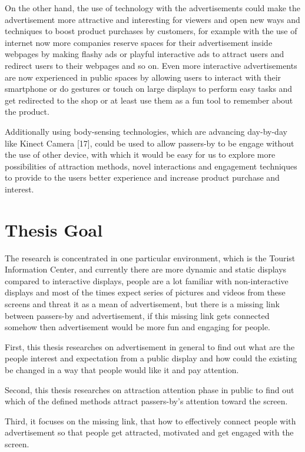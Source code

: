 On the other hand, the use of technology with the advertisements could make the advertisement more attractive and interesting for viewers and open new ways and techniques to boost product purchases by customers, for example with the use of internet now more companies reserve spaces for their advertisement inside webpages by making flashy ads or playful interactive ads to attract users and redirect users to their webpages and so on. Even more interactive advertisements are now experienced in public spaces by allowing users to interact with their smartphone or do gestures or touch on large displays to perform easy tasks and get redirected to the shop or at least use them as a fun tool to remember about the product.

Additionally using body-sensing technologies, which are advancing day-by-day like Kinect Camera [17], could be used to allow passers-by to be engage without the use of other device, with which it would be easy for us to explore more possibilities of attraction methods, novel interactions and engagement techniques to provide to the users better experience and increase product purchase and interest.


\section{Thesis Goal}
The research is concentrated in one particular environment, which is the Tourist Information Center, and currently there are more dynamic and static displays compared to interactive displays, people are a lot familiar with non-interactive displays and most of the times expect series of pictures and videos from these screens and threat it as a mean of advertisement, but there is a missing link between passers-by and advertisement, if this missing link gets connected somehow then advertisement would be more fun and engaging for people.

First, this thesis researches on advertisement in general to find out what are the people interest and expectation from a public display and how could the existing be changed in a way that people would like it and pay attention.

Second, this thesis researches on attraction attention phase in public to find out which of the defined methods attract passers-by’s attention toward the screen.

Third, it focuses on the missing link, that how to effectively connect people with advertisement so that people get attracted, motivated and get engaged with the screen.

